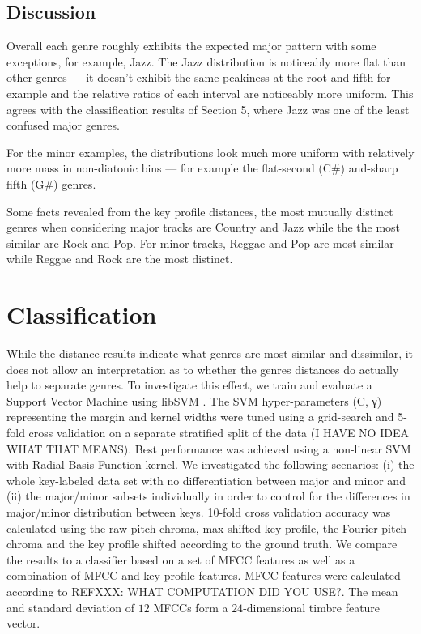 \documentclass{article}
\begin{document}
\subsection{Discussion}
Overall each genre roughly exhibits the expected major pattern with some exceptions, for example,  Jazz. The Jazz distribution is noticeably more flat than other genres --- it doesn't exhibit the same peakiness at the root and fifth for example and the relative ratios of each interval are noticeably more uniform. This agrees with the classification results of Section 5, where Jazz was one of the least confused major genres.

For the minor examples, the distributions look much more uniform with relatively more mass in non-diatonic bins --- for example the flat-second (C\#) and-sharp fifth (G\#) genres.

Some facts revealed from the key profile distances, the most mutually distinct genres when considering major tracks are Country and Jazz while the the most similar are Rock and Pop. For minor tracks, Reggae and Pop are most similar while Reggae and Rock are the most distinct.


\section{Classification}
While the distance results indicate what genres are most similar and dissimilar, it does not allow an interpretation as to whether the genres distances do actually help to separate genres. To investigate this effect, we train and evaluate a Support Vector Machine using libSVM \cite{chang_libsvm:_2011}.
The SVM hyper-parameters (C, γ) representing the margin and kernel widths were tuned using a grid-search and 5-fold cross validation on a separate stratified split of the data (I HAVE NO IDEA WHAT THAT MEANS). Best performance was achieved using a non-linear SVM with Radial Basis Function kernel.
We investigated the following scenarios: (i) the whole key-labeled data set with no differentiation between major and minor and (ii) the major/minor subsets individually in order to control for the differences in major/minor distribution between keys. 
10-fold cross validation  accuracy was calculated using the raw pitch chroma, max-shifted key profile, the Fourier pitch chroma and the key profile shifted according to the ground truth. We compare the results to a classifier based on a set of MFCC features as well as a combination of MFCC and key profile features. MFCC features were calculated according to REFXXX: WHAT COMPUTATION DID YOU USE?. The mean and standard deviation of $12$ MFCCs form a $24$-dimensional timbre feature vector. %
\end{document}
